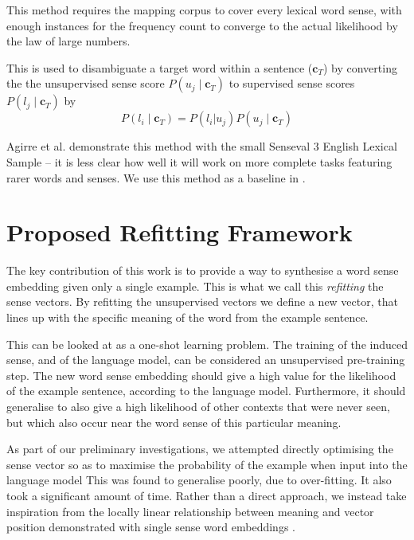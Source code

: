 \documentclass{sig-alternate}
\renewcommand{\c}{\mathbf{c}}
\begin{document}
This method requires the mapping corpus to cover every lexical word sense, with enough instances for the frequency count to converge to the actual likelihood by the law of large numbers.

This is used to disambiguate a target word within a sentence ($\c_T$)  by converting the the unsupervised sense score $P(u_j \mid \c_T)$ to supervised sense scores $P(l_j \mid \c_T)$ by
\begin{equation} \label{eq:agireewsd}
P(l_i \mid \c_T) = P(l_i | u_j) P(u_j \mid \c_T)
\end{equation}


Agirre et al. demonstrate this method with the small Senseval 3 English Lexical Sample \parencite{mihalcea2004senseval} -- it is less clear how well it will work on more complete tasks featuring rarer words and senses. We use this method as a baseline in .


\section{Proposed Refitting Framework} \label{refitting} \label{Framework}

The key contribution of this work is to provide a way to synthesise a word sense embedding given only a single example. This is what we call this \emph{refitting} the sense vectors. By refitting the unsupervised vectors we define a new vector, that lines up with the specific meaning of the word from the example sentence.

This can be looked at as a one-shot learning problem.
The training of the induced sense, and of the language model, can be considered an unsupervised pre-training step. The new word sense embedding should give a high value for the likelihood of the example sentence, according to the language model. Furthermore, it should generalise to also give a high likelihood of other contexts that were never seen, but which also occur near the word sense of this particular meaning.

As part of our preliminary investigations, we attempted directly optimising the sense vector so as to maximise the probability of the example when input into the language model  This was found to generalise poorly, due to over-fitting. It also took a significant amount of time. Rather than a direct approach, we instead take inspiration from the locally linear relationship between meaning and vector position demonstrated with single sense word embeddings \parencite{mikolov2013efficient,mikolovSkip,mikolov2013linguisticsubstructures}.
\end{document}

